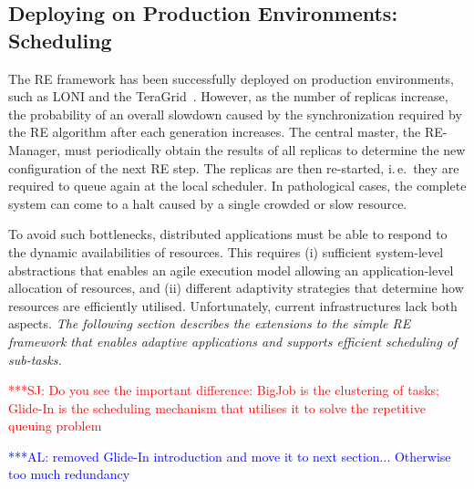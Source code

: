 \documentclass{rspublic}
\newcommand{\alnote}[1]{ {\textcolor{blue} { ***AL: #1 }}}
\newcommand{\jhanote}[1]{ {\textcolor{red} { ***SJ: #1 }}}
\newcommand{\alnote}[1]{}
\newcommand{\jhanote}[1]{}
\begin{document}
\subsection{Deploying on Production Environments: Scheduling}

The RE framework has been successfully deployed on
production environments, such as LONI and the 
TeraGrid~\citep{Luckow:2008la}. However, as the
number of replicas increase, the probability of an overall slowdown
caused by the synchronization required by the RE
algorithm after each generation increases.  The central master, the
RE-Manager, must periodically obtain the results of all replicas to
determine the new configuration of the next RE step. The replicas are
then re-started, i.\,e.\ they are required to queue again at the local
scheduler. In pathological cases, the complete system can come to a
halt caused by a single crowded or slow resource.  
                        
To avoid such bottlenecks, distributed applications must be able to
respond to the dynamic availabilities of resources. This requires (i)
sufficient system-level abstractions that enables an agile execution
model allowing an application-level allocation of resources, and (ii)
different adaptivity strategies that determine how resources are
efficiently utilised. Unfortunately, current infrastructures lack both
aspects. {\it The following section describes the extensions to the
  simple RE framework that enables adaptive applications and supports
  efficient scheduling of sub-tasks.}

\jhanote{Do you see the important difference: BigJob is the clustering
  of tasks; Glide-In is the scheduling mechanism that utilises it to
  solve the repetitive queuing problem}

\alnote{removed Glide-In introduction and move it to next
  section... Otherwise too much redundancy}

\end{document}
